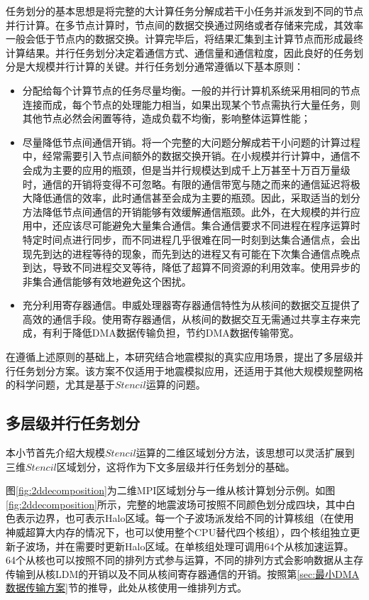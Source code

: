 任务划分的基本思想是将完整的大计算任务分解成若干小任务并派发到不同的节点并行计算。在多节点计算时，节点间的数据交换通过网络或者存储来完成，其效率一般会低于节点内的数据交换。计算完毕后，将结果汇集到主计算节点而形成最终计算结果。并行任务划分决定着通信方式、通信量和通信粒度，因此良好的任务划分是大规模并行计算的关键。并行任务划分通常遵循以下基本原则：
\begin{itemize}
  \item 分配给每个计算节点的任务尽量均衡。一般的并行计算机系统采用相同的节点连接而成，每个节点的处理能力相当，如果出现某个节点需执行大量任务，则其他节点必然会闲置等待，造成负载不均衡，影响整体运算性能；
  \item 尽量降低节点间通信开销。将一个完整的大问题分解成若干小问题的计算过程中，经常需要引入节点间额外的数据交换开销。在小规模并行计算中，通信不会成为主要的应用的瓶颈，但是当并行规模达到成千上万甚至十万百万量级时，通信的开销将变得不可忽略。有限的通信带宽与随之而来的通信延迟将极大降低通信的效率，此时通信甚至会成为主要的瓶颈。因此，采取适当的划分方法降低节点间通信的开销能够有效缓解通信瓶颈。此外，在大规模的并行应用中，还应该尽可能避免大量集合通信。集合通信要求不同进程在程序运算时特定时间点进行同步，而不同进程几乎很难在同一时刻到达集合通信点，会出现先到达的进程等待的现象，而先到达的进程又有可能在下次集合通信点晚点到达，导致不同进程交叉等待，降低了超算不同资源的利用效率。使用异步的非集合通信能够有效地避免这个困扰。
  \item 充分利用寄存器通信。申威处理器寄存器通信特性为从核间的数据交互提供了高效的通信手段。使用寄存器通信，从核间的数据交互无需通过共享主存来完成，有利于降低DMA数据传输负担，节约DMA数据传输带宽。
\end{itemize}

在遵循上述原则的基础上，本研究结合地震模拟的真实应用场景，提出了多层级并行任务划分方案。该方案不仅适用于地震模拟应用，还适用于其他大规模规整网格的科学问题，尤其是基于$Stencil$运算的问题。

\subsection{多层级并行任务划分}

本小节首先介绍大规模$Stencil$运算的二维区域划分方法，该思想可以灵活扩展到三维$Stencil$区域划分，这将作为下文多层级并行任务划分的基础。

图\ref{fig:2ddecomposition}为二维MPI区域划分与一维从核计算划分示例。如图\ref{fig:2ddecomposition}所示，完整的地震波场可按照不同颜色划分成四块，其中白色表示边界，也可表示Halo区域。每一个子波场派发给不同的计算核组（在使用神威超算大内存的情况下，也可以使用整个CPU替代四个核组），四个核组独立更新子波场，并在需要时更新Halo区域。在单核组处理可调用64个从核加速运算。64个从核也可以按照不同的排列方式参与运算，不同的排列方式会影响数据从主存传输到从核LDM的开销以及不同从核间寄存器通信的开销。按照第\ref{sec:最小DMA数据传输方案}节的推导，此处从核使用一维排列方式。

